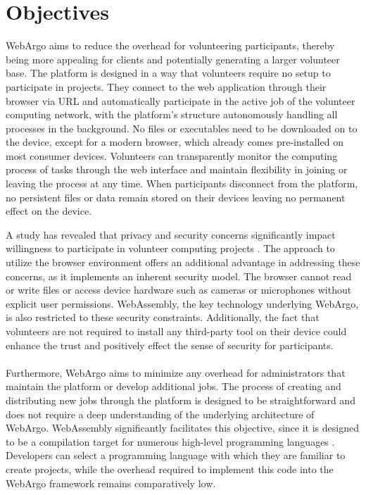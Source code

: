 \section{Objectives}
\label{sec:intro:objectives}
WebArgo aims to reduce the overhead for volunteering participants, thereby being more appealing for clients and potentially generating a larger volunteer base. The platform is designed in a way that volunteers require no setup to participate in projects. They connect to the web application through their browser via \acs{URL} and automatically participate in the active job of the volunteer computing network, with the platform's structure autonomously handling all processes in the background. No files or executables need to be downloaded on to the device, except for a modern browser, which already comes pre-installed on most consumer devices. Volunteers can transparently monitor the computing process of tasks through the web interface and maintain flexibility in joining or leaving the process at any time. When participants disconnect from the platform, no persistent files or data remain stored on their devices leaving no permanent effect on the device.

A study has revealed that privacy and security concerns significantly impact willingness to participate in volunteer computing projects \cite{intro:volunteerStudy}. The approach to utilize the browser environment offers an additional advantage in addressing these concerns, as it implements an inherent security model. The browser cannot read or write files or access device hardware such as cameras or microphones without explicit user permissions. WebAssembly, the key technology underlying WebArgo, is also restricted to these security constraints. Additionally, the fact that volunteers are not required to install any third-party tool on their device could enhance the trust and positively effect the sense of security for participants.
\\~\\
Furthermore, WebArgo aims to minimize any overhead for administrators that maintain the platform or develop additional jobs. The process of creating and distributing new jobs through the platform is designed to be straightforward and does not require a deep understanding of the underlying architecture of WebArgo. WebAssembly significantly facilitates this objective, since it is designed to be a compilation target for numerous high-level programming languages \cite{methodology:wasm, methodology:wasmW3C, methodology:wasmdocu, relatedwork:wasmedgecomputing}. Developers can select a programming language with which they are familiar to create projects, while the overhead required to implement this code into the WebArgo framework remains comparatively low. 

